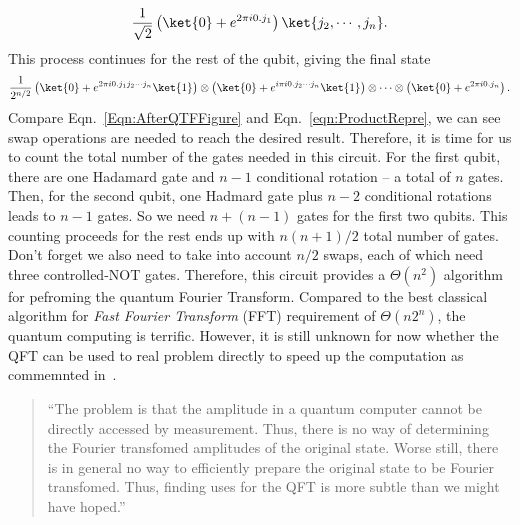 \begin{equation}
    \frac{1}{\sqrt{2}}\left(\ket{0}+e^{2\pi i0.j_1}\right)\ket{j_2,\cdots,j_n}.
\end{equation}
This process continues for the rest of the qubit, giving the final state
\begin{equation}
    \frac{1}{2^{n/2}}\left(\ket{0}+e^{2\pi i0.j_1j_2\cdots j_n}\ket{1}\right)\otimes\left(\ket{0}+e^{i\pi i0.j_2\cdots j_n}\ket{1}\right)\otimes\cdots\otimes\left(\ket{0}+e^{2\pi i0.j_n}\right).
    \label{Eqn:AfterQTFFigure}
\end{equation}
Compare Eqn.~\ref{Eqn:AfterQTFFigure} and Eqn.~\ref{eqn:ProductRepre}, we can see swap operations are needed to reach the desired result. Therefore, it is time for us to count the total number of the gates needed in this circuit. For the first qubit, there are one Hadamard gate and $n-1$ conditional rotation -- a total of $n$ gates. Then, for the second qubit, one Hadmard gate plus $n-2$ conditional rotations leads to $n-1$ gates. So we need $n+(n-1)$ gates for the first two qubits. This counting proceeds for the rest ends up with $n(n+1)/2$ total number of gates. Don't forget we also need to take into account $n/2$ swaps, each of which need three controlled-NOT gates. Therefore, this circuit provides a $\Theta(n^2)$ algorithm for pefroming the quantum Fourier Transform. Compared to the best classical algorithm for \textit{Fast Fourier Transform} (FFT) requirement of $\Theta(n2^n)$, the quantum computing is terrific. However, it is still unknown for now whether the QFT can be used to real problem directly to speed up the computation as commemnted in~\cite{NielsenChuang2010}.
\begin{quote}
    \ttfamily
    \raggedright
    \enquote{The problem is that the amplitude in a quantum computer cannot be directly accessed by measurement. Thus, there is no way of determining the Fourier transfomed amplitudes of the original state. Worse still, there is in general no way to efficiently prepare the original state to be Fourier transfomed. Thus, finding uses for the QFT is more subtle than we might have hoped.}
\end{quote}

